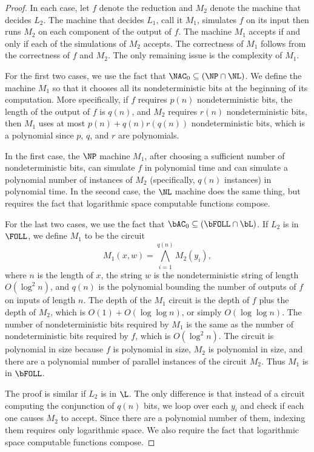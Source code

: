 \documentclass{article}
\begin{document}
\begin{proof}
  In each case, let $f$ denote the reduction and $M_2$ denote the machine that decides $L_2$.
  The machine that decides $L_1$, call it $M_1$, simulates $f$ on its input then runs $M_2$ on each component of the output of $f$.
  The machine $M_1$ accepts if and only if each of the simulations of $M_2$ accepts.
  The correctness of $M_1$ follows from the correctness of $f$ and $M_2$.
  The only remaining issue is the complexity of $M_1$.

  For the first two cases, we use the fact that $\NAC_0 \subseteq (\NP \cap \NL)$.
  We define the machine $M_1$ so that it chooses all its nondeterministic bits at the beginning of its computation.
  More specifically, if $f$ requires $p(n)$ nondeterministic bits, the length of the output of $f$ is $q(n)$, and $M_2$ requires $r(n)$ nondeterministic bits, then $M_1$ uses at most $p(n) + q(n) r(q(n))$ nondeterministic bits, which is a polynomial since $p$, $q$, and $r$ are polynomials.

  In the first case, the $\NP$ machine $M_1$, after choosing a sufficient number of nondeterministic bits, can simulate $f$ in polynomial time and can simulate a polynomial number of instances of $M_2$ (specifically, $q(n)$ instances) in polynomial time.
  In the second case, the $\NL$ machine does the same thing, but requires the fact that logarithmic space computable functions compose.

  For the last two cases, we use the fact that $\bAC_0 \subseteq (\bFOLL \cap \bL)$.
  If $L_2$ is in $\FOLL$, we define $M_1$ to be the circuit
  \begin{equation*}
    M_1(x, w) = \bigwedge_{i = 1}^{q(n)} M_2(y_i),
  \end{equation*}
  where $n$ is the length of $x$, the string $w$ is the nondeterministic string of length $O(\log^2 n)$, and $q(n)$ is the polynomial bounding the number of outputs of $f$ on inputs of length $n$.
  The depth of the $M_1$ circuit is the depth of $f$ plus the depth of $M_2$, which is $O(1) + O(\log \log n)$, or simply $O(\log \log n)$.
  The number of nondeterministic bits required by $M_1$ is the same as the number of nondeterministic bits required by $f$, which is $O(\log^2 n)$.
  The circuit is polynomial in size because $f$ is polynomial in size, $M_2$ is polynomial in size, and there are a polynomial number of parallel instances of the circuit $M_2$.
  Thus $M_1$ is in $\bFOLL$.

  The proof is similar if $L_2$ is in $\L$.
  The only difference is that instead of a circuit computing the conjunction of $q(n)$ bits, we loop over each $y_i$ and check if each one causes $M_2$ to accept.
  Since there are a polynomial number of them, indexing them requires only logarithmic space.
  We also require the fact that logarithmic space computable functions compose.
\end{proof}
\end{document}
